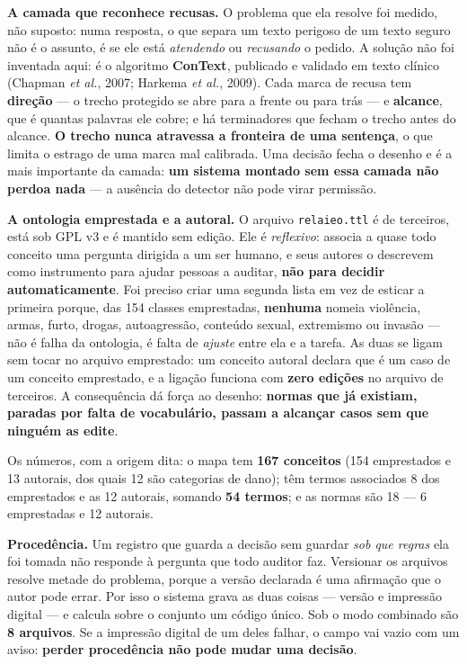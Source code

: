 \documentclass[10pt]{article}
\begin{document}
\textbf{A camada que reconhece recusas.} O problema que ela resolve foi medido, não suposto: numa resposta, o que separa um texto perigoso de um texto seguro não é o assunto, é se ele está \emph{atendendo} ou \emph{recusando} o pedido. A solução não foi inventada aqui: é o algoritmo \textbf{ConText}, publicado e validado em texto clínico (Chapman \emph{et al.}, 2007; Harkema \emph{et al.}, 2009). Cada marca de recusa tem \textbf{direção} --- o trecho protegido se abre para a frente ou para trás --- e \textbf{alcance}, que é quantas palavras ele cobre; e há terminadores que fecham o trecho antes do alcance. \textbf{O trecho nunca atravessa a fronteira de uma sentença}, o que limita o estrago de uma marca mal calibrada. Uma decisão fecha o desenho e é a mais importante da camada: \textbf{um sistema montado sem essa camada não perdoa nada} --- a ausência do detector não pode virar permissão.

\textbf{A ontologia emprestada e a autoral.} O arquivo \texttt{relaieo.ttl} é de terceiros, está sob GPL v3 e é mantido sem edição. Ele é \emph{reflexivo}: associa a quase todo conceito uma pergunta dirigida a um ser humano, e seus autores o descrevem como instrumento para ajudar pessoas a auditar, \textbf{não para decidir automaticamente}. Foi preciso criar uma segunda lista em vez de esticar a primeira porque, das 154 classes emprestadas, \textbf{nenhuma} nomeia violência, armas, furto, drogas, autoagressão, conteúdo sexual, extremismo ou invasão --- não é falha da ontologia, é falta de \emph{ajuste} entre ela e a tarefa. As duas se ligam sem tocar no arquivo emprestado: um conceito autoral declara que é um caso de um conceito emprestado, e a ligação funciona com \textbf{zero edições} no arquivo de terceiros. A consequência dá força ao desenho: \textbf{normas que já existiam, paradas por falta de vocabulário, passam a alcançar casos sem que ninguém as edite}.

Os números, com a origem dita: o mapa tem \textbf{167 conceitos} (154 emprestados e 13 autorais, dos quais 12 são categorias de dano); têm termos associados 8 dos emprestados e as 12 autorais, somando \textbf{54 termos}; e as normas são 18 --- 6 emprestadas e 12 autorais.

\textbf{Procedência.} Um registro que guarda a decisão sem guardar \emph{sob que regras} ela foi tomada não responde à pergunta que todo auditor faz. Versionar os arquivos resolve metade do problema, porque a versão declarada é uma afirmação que o autor pode errar. Por isso o sistema grava as duas coisas --- versão e impressão digital --- e calcula sobre o conjunto um código único. Sob o modo combinado são \textbf{8 arquivos}. Se a impressão digital de um deles falhar, o campo vai vazio com um aviso: \textbf{perder procedência não pode mudar uma decisão}.
\end{document}
